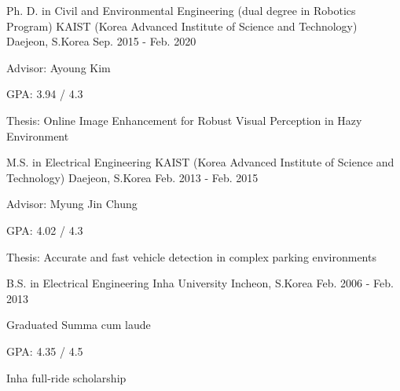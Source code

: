 

\begin{cventries}
    \cventry
    {Ph. D. in Civil and Environmental Engineering (dual degree in Robotics Program)} %
    {KAIST (Korea Advanced Institute of Science and Technology)} %
    {Daejeon, S.Korea} %
    {Sep. 2015 - Feb. 2020} %
    {
      \begin{cvitems} %
        \item {Advisor: Ayoung Kim}
        \item {GPA: 3.94 / 4.3}
        \item {Thesis: Online Image Enhancement for Robust Visual Perception in Hazy Environment}
      \end{cvitems}
    }

    \cventry
    {M.S. in Electrical Engineering} %
    {KAIST (Korea Advanced Institute of Science and Technology)} %
    {Daejeon, S.Korea} %
    {Feb. 2013 - Feb. 2015} %
    {
      \begin{cvitems} %
        \item {Advisor: Myung Jin Chung}
        \item {GPA: 4.02 / 4.3}
        \item {Thesis: Accurate and fast vehicle detection in complex parking environments}
      \end{cvitems}
    }
    
    \cventry
    {B.S. in Electrical Engineering} %
    {Inha University} %
    {Incheon, S.Korea} %
    {Feb. 2006 - Feb. 2013} %
    {
      \begin{cvitems} %
        \item {Graduated Summa cum laude}
        \item {GPA: 4.35 / 4.5}
        \item {Inha full-ride scholarship}
      \end{cvitems}
    }
\end{cventries}
